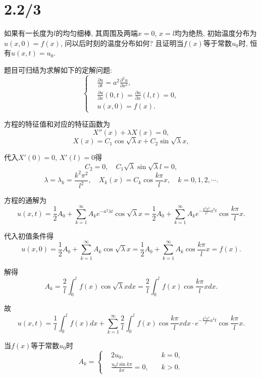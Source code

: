 \documentclass[11pt,a4paper]{article}
\author{刘逸灏 (515370910207)}
\begin{document}
\maketitle

\section{2.2/3}
\begin{problem}
如果有一长度为$l$的均匀细棒, 其周围及两端$x=0$, $x=l$均为绝热, 初始温度分布为$u(x,0)=f(x)$, 问以后时刻的温度分布如何? 且证明当$f(x)$等于常数$u_0$时, 恒有$u(x,t)=u_0$.
\end{problem}

题目可归结为求解如下的定解问题:
$$\left\{\begin{aligned}
     & \frac{\partial u}{\partial t}=a^2\frac{\partial^2u}{\partial x^2},        \\
     & \frac{\partial u}{\partial x}(0,t) =\frac{\partial u}{\partial x}(l,t)=0, \\
     & u(x,0)=f(x).
  \end{aligned}\right.$$

方程的特征值和对应的特征函数为
$$X''(x)+\lambda X(x)=0,$$
$$X(x)=C_1\cos\sqrt{\lambda}x+C_2\sin\sqrt{\lambda}x,$$

代入$X'(0)=0$, $X'(l)=0$得
$$C_2=0,\quad C_1\sqrt{\lambda}\sin\sqrt{\lambda}l=0,$$
$$\lambda=\lambda_k=\frac{k^2\pi^2}{l^2},\quad X_k(x)=C_k\cos\frac{k\pi}{l}x,\quad k=0,1,2,\cdots.$$

方程的通解为
$$u(x,t)=\frac{1}{2}A_0+\sum_{k=1}^\infty A_ke^{-a^2\lambda t}\cos\sqrt{\lambda}x=\frac{1}{2}A_0+\sum_{k=1}^\infty A_k e^{-\frac{k^2\pi^2}{l^2}a^2 t}\cos\frac{k\pi}{l}x.$$

代入初值条件得
$$u(x,0)=\frac{1}{2}A_0+\sum_{k=1}^\infty A_k\cos\sqrt{\lambda}x=\frac{1}{2}A_0+\sum_{k=1}^\infty A_k\cos\frac{k\pi}{l}x=f(x).$$

解得
$$A_k=\frac{2}{l}\int_0^l f(x)\cos\sqrt{\lambda}xdx=\frac{2}{l}\int_0^l f(x)\cos\frac{k\pi}{l}xdx.$$

故
$$u(x,t)=\frac{1}{l}\int_0^l f(x)dx+\sum_{k=1}^\infty \frac{2}{l}\int_0^l f(x)\cos\frac{k\pi}{l}xdx \cdot e^{-\frac{k^2\pi^2}{l^2}a^2 t}\cos\frac{k\pi}{l}x.$$

当$f(x)$等于常数$u_0$时
$$A_k=\left\{\begin{aligned}
     & 2u_0,\quad                         & k=0, \\
     & \frac{u_0l\sin k\pi}{k\pi}=0,\quad & k>0.
  \end{aligned}\right.$$
\end{document}
